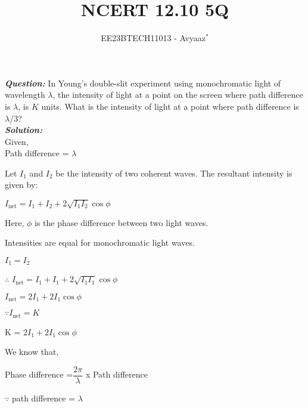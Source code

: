 \documentclass[journal,12pt,twocolumn]{IEEEtran}
\theoremstyle{remark}
\begin{document}

\vspace{3cm}

\title{NCERT 12.10 5Q}
\author{EE23BTECH11013 - Avyaaz$^{*}$%
}
\maketitle
\newpage
\bigskip

\renewcommand{\thefigure}{\theenumi}
\renewcommand{\thetable}{\theenumi}

\large\textbf{\textsl{Question:}}
In Young’s double-slit experiment using monochromatic light of wavelength $\lambda$, the intensity of light at a point on the screen where path difference is $\lambda$, is $K$ units. What is the intensity of light at a
point where path difference is $\lambda$/3?\\
\large\textbf{\textsl{Solution:}}\\
Given,\\
\hspace*{1cm}Path difference = $\lambda$


Let $I_1$ and $I_2$ be the intensity of two coherent waves. The resultant intensity is given by:

$I_{\text{net}} = I_1 + I_2 + 2\sqrt{I_1I_2}\cos{\phi}$

Here, $\phi$ is the phase difference between two light waves.

Intensities are equal for monochromatic light waves.

\hspace{1cm}$I_1 = I_2$

$\therefore$ $I_{\text{net}} = I_1 + I_1 + 2\sqrt{I_1I_1}\cos{\phi}$

\vspace{0.2cm}

       \hspace{0.2cm}      $I_{\text{net}} = 2I_1 + 2I_1\cos{\phi}$

$\because I_{\text{net}} = K$


          K = $ 2I_1 + 2I_1\cos{\phi}$
 
We know that, 

      Phase difference =$\dfrac{2\pi}{\lambda}$ x Path difference

      \vspace{0.2cm}

$\because$ path difference = $\lambda$

\vspace{0.2cm}
\end{document}
